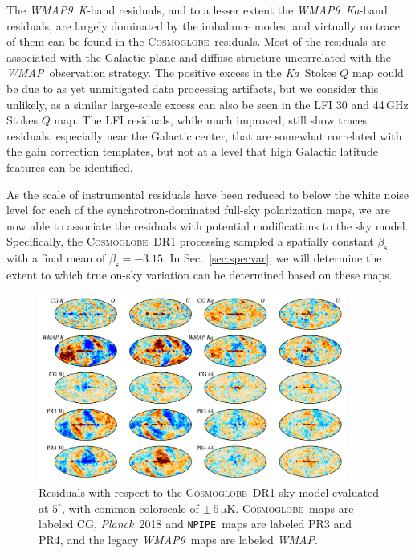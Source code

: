 \documentclass[twocolumn]{../../common/aa}
\def\WMAP{\emph{WMAP}}
\def\WMAPnine{\emph{WMAP9}}
\def\Planck{\emph{Planck}}
\newcommand{\cosmoglobe}{\textsc{Cosmoglobe}}
\newcommand{\npipe}[0]{\texttt{NPIPE}}
\newcommand{\K}[0]{\textit K}
\newcommand{\Ka}[0]{\textit{Ka}}
\begin{document}
The \WMAPnine\ \K-band residuals, and to a lesser extent the \WMAPnine\ \Ka-band residuals, are largely dominated by the imbalance modes, and virtually no trace of them can be found in the \cosmoglobe\ residuals. Most of the residuals are associated with the Galactic plane and diffuse structure uncorrelated with the \WMAP\ observation strategy. The positive excess in the \Ka\ Stokes $Q$ map could be due to as yet unmitigated data processing artifacts, but we consider this unlikely, as a similar large-scale excess can also be seen in the LFI 30 and 44\,GHz Stokes $Q$ map.
The LFI residuals, while much improved, still show traces residuals, especially near the Galactic center, that are somewhat correlated with the gain correction templates, but not at a level that high Galactic latitude features can be identified. 

As the scale of instrumental residuals have been reduced to below the white noise level for each of the synchrotron-dominated full-sky polarization maps, we are now able to associate the residuals with potential modifications to the sky model. Specifically, the \cosmoglobe\ DR1 processing sampled a spatially constant $\beta_\mathrm s$ with a final mean of $\beta_\mathrm s=-3.15$. In Sec.~\ref{sec:specvar}, we will determine the extent to which true on-sky variation can be determined based on these maps.

\begin{figure}
	\begin{center}
	\includegraphics[width=0.9\textwidth]{figures/CG_DR1_residuals.pdf}
	\end{center}
	\caption{Residuals with respect to the \cosmoglobe\ DR1 sky model evaluated at $5^\circ$, with common colorscale of $\pm\,5\,\mathrm{\mu K}$. \cosmoglobe\ maps are labeled CG, \Planck\ 2018 and \npipe\ maps are labeled PR3 and PR4, and the legacy \WMAPnine\ maps are labeled \WMAP.}
	\label{fig:cg_residuals}
\end{figure}
\end{document}
